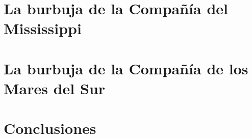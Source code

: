\documentclass[a4paper,11pt]{scrbook} %
\begin{document}


\chapter{La burbuja de la Compañía del Mississippi}



\chapter{La burbuja de la Compañía de los Mares del Sur}




\backmatter                                               %

\chapter{Conclusiones}










\end{document}
